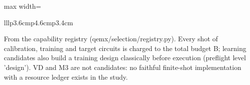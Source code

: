 \begin{table}[htbp]
\begin{adjustbox}{max width=\textwidth}
\begin{tabular}{lllp{3.6cm}p{4.6cm}p{3.4cm}}
\bottomrule
\end{tabular}\end{adjustbox}
\par\vspace{0.5em}
\begin{minipage}{0.97\linewidth}
\footnotesize From the capability registry (qemx/selection/registry.py). Every shot of calibration, training and target circuits is charged to the total budget B; learning candidates also build a training design classically before execution (preflight level 'design'). VD and M3 are not candidates: no faithful finite-shot implementation with a resource ledger exists in the study.
\end{minipage}
\end{table}
